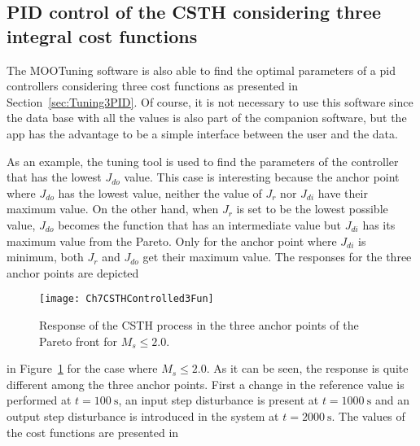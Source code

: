 \subsection{PID control of the CSTH considering three integral cost functions}
\label{sec:PIDCSTH3Fun}
The MOOTuning software is also able to find the optimal parameters of a \gls{pid} controllers considering three cost functions as presented in Section~\ref{sec:Tuning3PID}. Of course, it is not necessary to use this software since the data base with all the values is also part of the companion software, but the \matlab{} app has the advantage to be a simple interface between the user and the data.

As an example, the tuning tool is used to find the parameters of the controller that has the lowest $J_{do}$ value. This case is interesting because the anchor point where $J_{do}$ has the lowest value, neither the value of $J_r$ nor $J_{di}$ have their maximum value. On the other hand, when $J_{r}$ is set to be the lowest possible value, $J_{do}$ becomes the function that has an intermediate value but $J_{di}$ has its maximum value from the Pareto. Only for the anchor point where $J_{di}$ is minimum, both $J_r$ and $J_{do}$ get their maximum value. The responses for the three anchor points are depicted %
\begin{figure}[tb]
	\centering
	\texttt{[image: Ch7CSTHControlled3Fun]}
	\caption{Response of the CSTH process in the three anchor points of the Pareto front for $M_s \leq 2.0$.}
	\label{fig:Ch7CSTHControlled3Fun}
\end{figure}
%
in Figure~\ref{fig:Ch7CSTHControlled3Fun} for the case where $M_s \leq 2.0$. As it can be seen, the response is quite different among the three anchor points. First a change in the reference value is performed at $t=\SI{100}{\second}$, an input step disturbance is present at $t=\SI{1000}{\second}$ and an output step disturbance is introduced in the system at $t=\SI{2000}{\second}$. The values of the cost functions are presented in %
%
